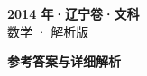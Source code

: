 \documentclass[zihao=-4, a4paper]{ctexart}
\begin{document}
\begin{center}
  {\Large\bfseries 2014 年·辽宁卷·文科}\\[4pt]
  {\large 数学 · 解析版}
\end{center}
\medskip
{}

\clearpage
{}
\begin{center}{\Large\bfseries 参考答案与详细解析}\end{center}
\medskip

\end{document}
